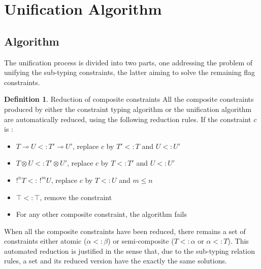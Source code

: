 \documentclass[10pt]{article}
\theoremstyle{plain}
\theoremstyle{definition}
\newtheorem{defn}{Definition}[subsection] %
\begin{document}
\section{Unification Algorithm}

\subsection{Algorithm}

The unification process is divided into two parts, one addressing the problem of unifying the sub-typing constraints,
the latter aiming to solve the remaining flag constraints.

\begin{defn}{Reduction of composite constraints}
	All the composite constraints produced by either the constraint typing
  algorithm or the unification algorithm are automatically reduced, using the following reduction rules.
  If the constraint $c$ is :
  	\begin{itemize}
      \item $T \multimap U <: T' \multimap U'$, replace $c$ by $T' <: T$ and $U <: U'$
      \item $T \otimes U <: T' \otimes U'$, replace $c$ by $T <: T'$ and $U <: U'$
      \item $!^n T <: \, !^m U$, replace $c$ by $T <: U$ and $m \le n$
      \item $\top <: \top$, remove the constraint
      \item For any other composite constraint, the algorithm fails
    \end{itemize}
  When all the composite constraints have been reduced, there remains a set of constraints either atomic ($\alpha <: \beta$) or
  semi-composite ($T <: \alpha$ or $\alpha <: T$).
  This automated reduction is justified in the sense that, due to the sub-typing relation rules, a set and its reduced version
  have the exactly the same solutions.
\end{defn}
\end{document}
